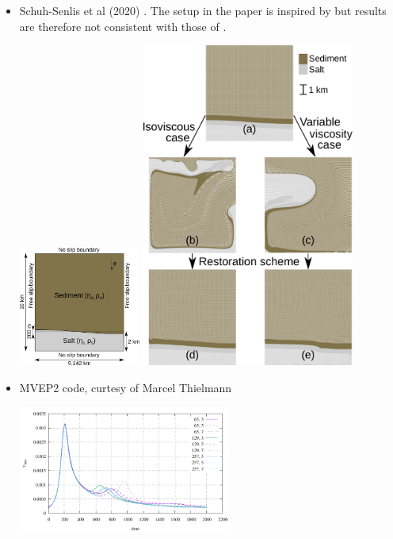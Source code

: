 \begin{itemize}
\item Schuh-Senlis et al (2020) \cite{sctc20}. The setup in the paper is inspired 
by \cite{vaks97} but results are therefore not consistent with those of \cite{vaks97}.

\begin{center}
\includegraphics[width=4cm]{images/benchmark_vaks97/schuh_senlis_etal/fig04}
\includegraphics[width=7cm]{images/benchmark_vaks97/schuh_senlis_etal/fig05}
\end{center}

\item MVEP2 code, curtesy of Marcel Thielmann 

\begin{center}
\includegraphics[width=7cm]{images/benchmark_vaks97/MVEP2/vrms.pdf}
\end{center}






\end{itemize}
